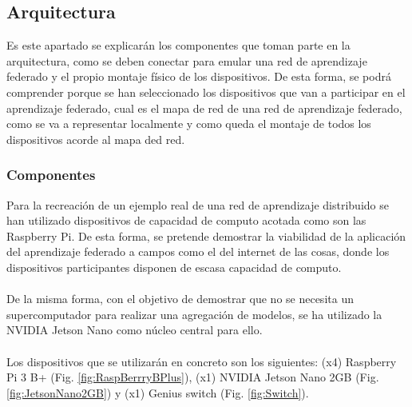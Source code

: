 \subsection{Arquitectura}
Es este apartado se explicarán los componentes que toman parte en la arquitectura, como se deben conectar para emular una red de aprendizaje federado y el propio montaje físico de los dispositivos. De esta forma, se podrá comprender porque se han seleccionado los dispositivos que van a participar en el aprendizaje federado, cual es el mapa de red de una red de aprendizaje federado, como se va a representar localmente y como queda el montaje de todos los dispositivos acorde al mapa ded red.  

\subsubsection{Componentes}
Para la recreación de un ejemplo real de una red de aprendizaje distribuido se han utilizado dispositivos de capacidad de computo acotada como son las Raspberry Pi. De esta forma, se pretende demostrar la viabilidad de la aplicación del aprendizaje federado a campos como el del internet de las cosas, donde los dispositivos participantes disponen de escasa capacidad de computo.
\\ \\
De la misma forma, con el objetivo de demostrar que no se necesita un supercomputador para realizar una agregación de modelos, se ha utilizado la NVIDIA Jetson Nano como núcleo central para ello.
\\ \\
Los dispositivos que se utilizarán en concreto son los siguientes: (x4) Raspberry Pi 3 B+ (Fig. \ref{fig:RaspBerrryBPlus}), (x1) NVIDIA Jetson Nano 2GB (Fig. \ref{fig:JetsonNano2GB}) y (x1) Genius switch (Fig. \ref{fig:Switch}).


